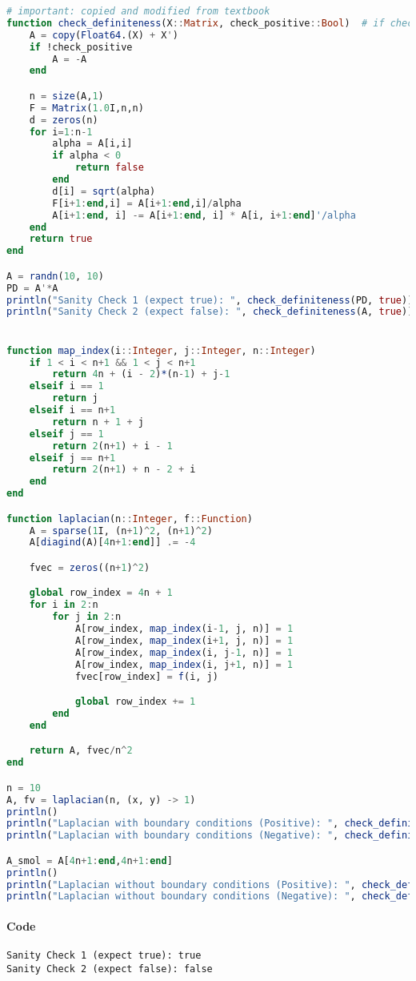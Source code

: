 \documentclass[]{exam}
\let\oldparagraph\paragraph
\renewcommand{\paragraph}[1]{\oldparagraph{#1}\mbox{}}
\begin{document}
\begin{questions}
\begin{enumerate}[label=\arabic*.]
\begin{lstlisting}[language=julia]
# important: copied and modified from textbook
function check_definiteness(X::Matrix, check_positive::Bool)  # if check_positive = true, check if positive definite, else check if negative definite
	A = copy(Float64.(X) + X')
	if !check_positive
		A = -A
	end

	n = size(A,1)
	F = Matrix(1.0I,n,n)
	d = zeros(n)
	for i=1:n-1
		alpha = A[i,i]
		if alpha < 0
			return false
		end
		d[i] = sqrt(alpha)
		F[i+1:end,i] = A[i+1:end,i]/alpha
		A[i+1:end, i] -= A[i+1:end, i] * A[i, i+1:end]'/alpha
	end
	return true
end

A = randn(10, 10)
PD = A'*A
println("Sanity Check 1 (expect true): ", check_definiteness(PD, true))
println("Sanity Check 2 (expect false): ", check_definiteness(A, true))


function map_index(i::Integer, j::Integer, n::Integer)
	if 1 < i < n+1 && 1 < j < n+1
		return 4n + (i - 2)*(n-1) + j-1
	elseif i == 1
		return j
	elseif i == n+1
		return n + 1 + j
	elseif j == 1
		return 2(n+1) + i - 1
	elseif j == n+1
		return 2(n+1) + n - 2 + i
	end
end

function laplacian(n::Integer, f::Function)
	A = sparse(1I, (n+1)^2, (n+1)^2)
	A[diagind(A)[4n+1:end]] .= -4

	fvec = zeros((n+1)^2)

	global row_index = 4n + 1
	for i in 2:n
		for j in 2:n
			A[row_index, map_index(i-1, j, n)] = 1
			A[row_index, map_index(i+1, j, n)] = 1
			A[row_index, map_index(i, j-1, n)] = 1
			A[row_index, map_index(i, j+1, n)] = 1
			fvec[row_index] = f(i, j)

			global row_index += 1
		end
	end

	return A, fvec/n^2
end

n = 10
A, fv = laplacian(n, (x, y) -> 1)
println()
println("Laplacian with boundary conditions (Positive): ", check_definiteness(Matrix(A), true))
println("Laplacian with boundary conditions (Negative): ", check_definiteness(Matrix(A), false))

A_smol = A[4n+1:end,4n+1:end]
println()
println("Laplacian without boundary conditions (Positive): ", check_definiteness(Matrix(A_smol), true))
println("Laplacian without boundary conditions (Negative): ", check_definiteness(Matrix(A_smol), false))
\end{lstlisting}
		\paragraph{Code}
\begin{lstlisting}
Sanity Check 1 (expect true): true
Sanity Check 2 (expect false): false


\end{lstlisting}
\end{enumerate}
\end{questions}
\end{document}
